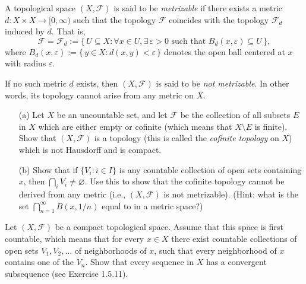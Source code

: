 \begin{problem}[15pts]
    \vphantom{text}
    \begin{definition}\label{def:metrizable}
A topological space $(X,\mathcal{F})$ is said to be \emph{metrizable} if there exists a metric $d : X \times X \to [0,\infty)$ such that the topology $\mathcal{F}$ coincides with the topology $\mathcal{F}_d$ induced by $d$.  
That is,
\[
\mathcal{F} = \mathcal{F}_d := \{\, U \subseteq X : \forall x \in U, \exists\, \varepsilon > 0 \text{ such that } B_d(x,\varepsilon) \subseteq U \,\},
\]
where $B_d(x,\varepsilon) := \{\, y \in X : d(x,y) < \varepsilon \,\}$ denotes the open ball centered at $x$ with radius $\varepsilon$.

\medskip
If no such metric $d$ exists, then $(X,\mathcal{F})$ is said to be \emph{not metrizable}.  
In other words, its topology cannot arise from any metric on $X$.
\end{definition}

\begin{enumerate}
\item[(a)]  Let $X$ be an uncountable set, and let $\mathcal{F}$ be the collection of all subsets $E$ in $X$ which are either empty or cofinite (which means that $X \setminus E$ is finite).  
Show that $(X, \mathcal{F})$ is a topology (this is called the \emph{cofinite topology} on $X$) which is not Hausdorff  and is compact.  

\item[(b)] 
Show that if $\{V_i : i \in I\}$ is any countable collection of open sets containing $x$, then $\bigcap_i V_i \neq \varnothing$.  
Use this to show that the cofinite topology cannot be derived from any metric (i.e., $(X, \mathcal{F})$ is not metrizable).  
(Hint: what is the set $\bigcap_{n=1}^\infty B(x, 1/n)$ equal to in a metric space?)

\end{enumerate}
\end{problem}
\begin{problem}[15pts]
    Let $(X, \mathcal{F})$ be a compact topological space.  
Assume that this space is first countable, which means that for every $x \in X$ there exist countable collections of open sets $V_1, V_2, \ldots$ of neighborhoods of $x$, such that every neighborhood of $x$ contains one of the $V_n$.  
Show that every sequence in $X$ has a convergent subsequence
 (see Exercise 1.5.11).
\end{problem}
